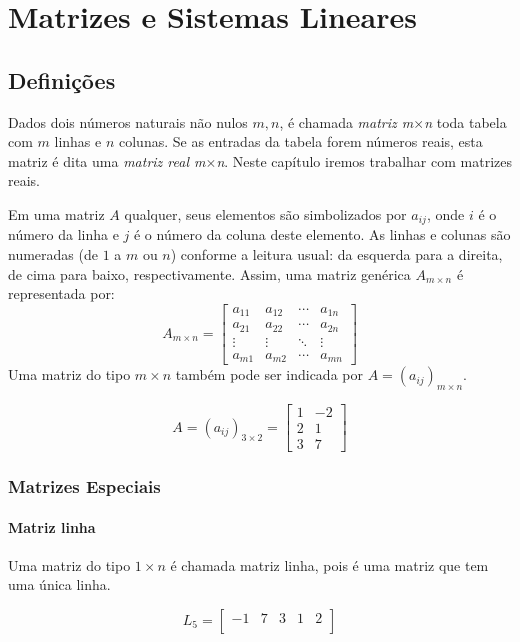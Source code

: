 \chapter{Matrizes e Sistemas Lineares}

\section{Definições}
Dados dois números naturais não nulos $m,n$, é chamada \emph{matriz m$\times$n} toda tabela com $m$ linhas e $n$ colunas. Se as entradas da tabela forem números reais, esta matriz é dita uma \emph{matriz real m$\times$n}. Neste capítulo iremos trabalhar com matrizes reais.\par 
Em uma matriz $A$ qualquer, seus elementos são simbolizados por $a_{ij}$, onde $i$ é o número da linha e $j$ é o número da coluna deste elemento. As linhas e colunas são numeradas (de $1$ a $m$ ou $n$) conforme a leitura usual: da esquerda para a direita, de cima para baixo, respectivamente. Assim, uma matriz genérica $A_{m\times n}$ é representada por:
\[A_{m\times n}={\begin{bmatrix}
a_{11} & a_{12} & \cdots & a_{1n} \\
a_{21} & a_{22} & \cdots & a_{2n} \\ 
\vdots & \vdots & \ddots & \vdots \\
a_{m1} & a_{m2} & \cdots & a_{mn} 
\end{bmatrix}}\]
Uma matriz do tipo $m \times n$ também pode ser indicada por $A=(a_{ij})_{m\times n}$.
\begin{exemplo}
\[A=(a_{ij})_{3\times 2}=\begin{bmatrix}
1 & -2  \\
2 & 1  \\
3 & 7 
\end{bmatrix}\]
\end{exemplo}

\subsection{Matrizes Especiais}
\subsubsection*{Matriz linha} Uma matriz do tipo $1 \times n$ é chamada matriz linha, pois é uma matriz que tem uma única linha.
\begin{exemplo}
\[L_{5}=\begin{bmatrix} 
-1 & 7 & 3 & 1 & 2 \\
\end{bmatrix}\]
\end{exemplo}
